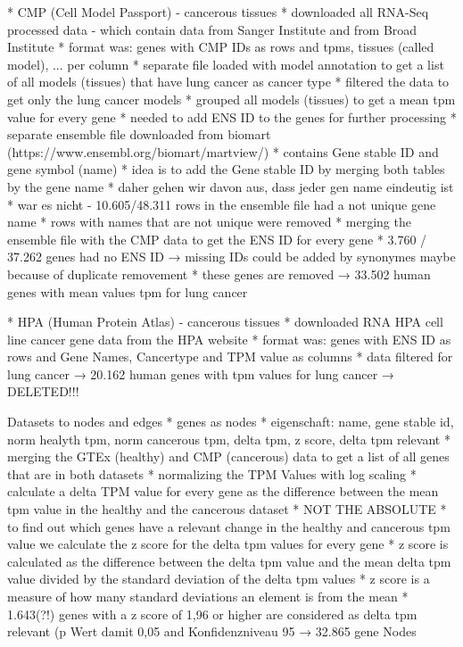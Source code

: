 \documentclass[11pt,a4paper]{article}
\begin{document}
    * CMP (Cell Model Passport) - cancerous tissues
        * downloaded all RNA-Seq processed data - which contain data from Sanger Institute and from Broad Institute
        * format was: genes with CMP IDs as rows and tpms, tissues (called model), ... per column
        * separate file loaded with model annotation to get a list of all models (tissues) that have lung cancer as cancer type
        * filtered the data to get only the lung cancer models
        * grouped all models (tissues) to get a mean tpm value for every gene
        * needed to add ENS ID to the genes for further processing
        * separate ensemble file downloaded from biomart (https://www.ensembl.org/biomart/martview/)
        * contains Gene stable ID and gene symbol (name)
        * idea is to add the Gene stable ID by merging both tables by the gene name
        * daher gehen wir davon aus, dass jeder gen name eindeutig ist
        * war es nicht - 10.605/48.311 rows in the ensemble file had a not unique gene name
        * rows with names that are not unique were removed
        * merging the ensemble file with the CMP data to get the ENS ID for every gene
        * 3.760 / 37.262 genes had no ENS ID → missing IDs could be added by synonymes maybe because of duplicate removement
        * these genes are removed
    → 33.502 human genes with mean values tpm for lung cancer

    * HPA (Human Protein Atlas) - cancerous tissues
        * downloaded RNA HPA cell line cancer gene data from the HPA website
        * format was: genes with ENS ID as rows and Gene Names, Cancertype and TPM value as columns
        * data filtered for lung cancer
    → 20.162 human genes with tpm values for lung cancer
    → DELETED!!!

Datasets to nodes and edges
    * genes as nodes
        * eigenschaft: name, gene stable id, norm healyth tpm, norm cancerous tpm, delta tpm, z score, delta tpm relevant
        * merging the GTEx (healthy) and CMP (cancerous) data to get a list of all genes that are in both datasets
        * normalizing the TPM Values with log scaling
        * calculate a delta TPM value for every gene as the difference between the mean tpm value in the healthy and the cancerous dataset
        * NOT THE ABSOLUTE
        * to find out which genes have a relevant change in the healthy and cancerous tpm value we calculate the z score for the delta tpm values for every gene
        * z score is calculated as the difference between the delta tpm value and the mean delta tpm value divided by the standard deviation of the delta tpm values
        * z score is a measure of how many standard deviations an element is from the mean
        * 1.643(?!) genes with a z score of 1,96 or higher are considered as delta tpm relevant (p Wert damit 0,05 and Konfidenzniveau 95%
    → 32.865 gene Nodes
\end{document}
